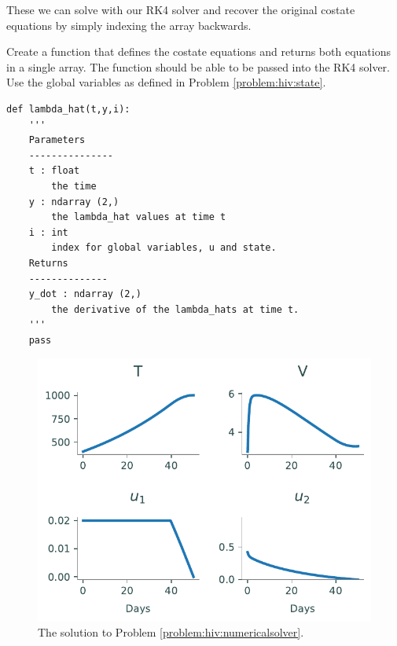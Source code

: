 These we can solve with our RK4 solver and recover the original costate equations by simply indexing the array backwards.

\begin{problem}
Create a function that defines the costate equations and returns both equations in a single array. The function should be able to be passed into the RK4 solver. Use the global variables as defined in Problem \ref{problem:hiv:state}.

\begin{lstlisting}
def lambda_hat(t,y,i):
	'''
	Parameters
	---------------
	t : float
		the time
	y : ndarray (2,)
		the lambda_hat values at time t
	i : int
		index for global variables, u and state.
	Returns
	--------------
	y_dot : ndarray (2,)
		the derivative of the lambda_hats at time t.
	'''
	pass
\end{lstlisting}

\label{problem:hiv:costateequations}
\end{problem}


\begin{figure}
\centering
\includegraphics[width=5in]{figures/hiv_solution.pdf}
\caption{The solution to Problem \ref{problem:hiv:numericalsolver}.}
\label{fig:hiv:solutions}
\end{figure}



